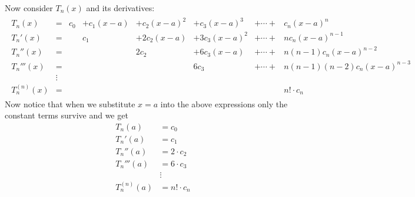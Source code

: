 Now consider $T_n(x)$ and its derivatives:
\begin{align*}
\begin{array}{rclrrrcl}
  T_n(x) &=& c_0 &+ c_1(x-a) & + c_2 (x-a)^2 & + c_3(x-a)^3 &+ \cdots+ & c_n (x-a)^n
\\[1ex]
  T_n'(x) &=&  &c_1 & + 2 c_2 (x-a) & + 3c_3(x-a)^2 &+ \cdots +&  n c_n (x-a)^{n-1}
\\[1ex]
  T_n''(x) &=&  &  & 2 c_2 & + 6c_3(x-a) &+ \cdots +&  n(n-1) c_n (x-a)^{n-2} \\[1ex]
  T_n'''(x) &=&  &  & & 6c_3 &+ \cdots + &  n(n-1)(n-2) c_n (x-a)^{n-3} \\[1ex]
  & \vdots \\[1ex]
  T_n^{(n)}(x) &=&  &  & & & &  n! \cdot c_n
\end{array}
\end{align*}
Now notice that when we substitute $x=a$ into the above expressions only the constant
terms survive and we get
\begin{align*}
  T_n(a) &= c_0\\
  T_n'(a) &= c_1\\
  T_n''(a) &= 2\cdot c_2\\
  T_n'''(a) &= 6 \cdot c_3\\
  &\vdots \\
  T_n^{(n)}(a) &= n! \cdot c_n
\end{align*}
